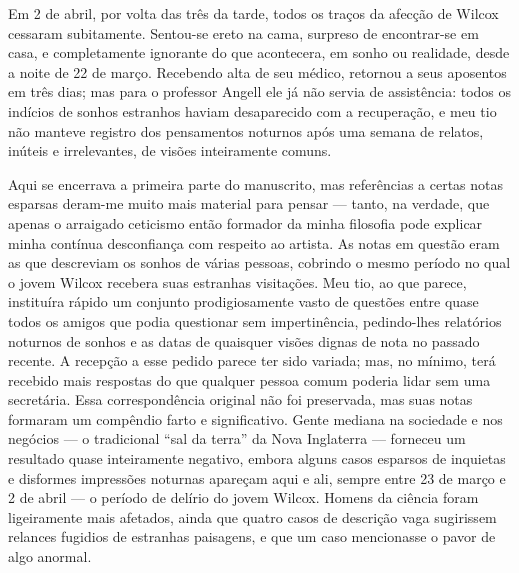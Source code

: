 Em 2 de abril, por volta das três da tarde, todos os traços da afecção de
Wilcox cessaram subitamente. Sentou-se ereto na cama, surpreso de
encontrar-se em casa, e completamente ignorante do que acontecera, em sonho
ou realidade, desde a noite de 22 de março. Recebendo alta de seu
médico, retornou a seus aposentos em três dias; mas para o professor
Angell ele já não servia de assistência: todos os indícios de sonhos
estranhos haviam desaparecido com a recuperação, e meu tio não
manteve registro dos pensamentos noturnos após uma semana de relatos,
inúteis e irrelevantes, de visões inteiramente comuns.

Aqui se encerrava a primeira parte do manuscrito, mas referências a
certas notas esparsas deram-me muito mais material para pensar ---
tanto, na verdade, que apenas o arraigado ceticismo então formador da
minha filosofia pode explicar minha contínua desconfiança com respeito
ao artista. As notas em questão eram as que descreviam os sonhos de
várias pessoas, cobrindo o mesmo período no qual o jovem Wilcox recebera
suas estranhas visitações. Meu tio, ao que parece, instituíra rápido um
conjunto prodigiosamente vasto de questões entre quase todos os amigos
que podia questionar sem impertinência, pedindo-lhes relatórios noturnos
de sonhos e as datas de quaisquer visões dignas de nota no passado
recente. A recepção a esse pedido parece ter sido variada; mas, no
mínimo, terá recebido mais respostas do que qualquer pessoa comum
poderia lidar sem uma secretária. Essa correspondência original não foi
preservada, mas suas notas formaram um compêndio farto e significativo.
Gente mediana na sociedade e nos negócios --- o tradicional ``sal da
terra'' da Nova Inglaterra --- forneceu um resultado quase inteiramente
negativo, embora alguns casos esparsos de inquietas e disformes
impressões noturnas apareçam aqui e ali, sempre entre 23 de março e 2 de
abril --- o período de delírio do jovem Wilcox. Homens da ciência foram
ligeiramente mais afetados, ainda que quatro casos de descrição vaga
sugirissem relances fugidios de estranhas paisagens, e que um caso
mencionasse o pavor de algo anormal.

